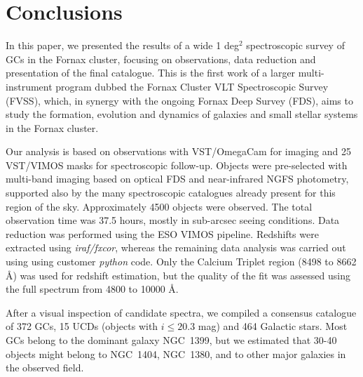 \documentclass[useAMS,usenatbib]{mn2e}
\begin{document}
\section{Conclusions}
\label{sec:conclusions}
In this paper, we presented the results of a wide 1 deg$^2$ spectroscopic survey of 
GCs in the Fornax cluster, focusing on observations, data 
reduction and presentation of the final catalogue. This is the first work of a 
larger multi-instrument program dubbed the Fornax Cluster VLT Spectroscopic 
Survey (FVSS), which, in synergy with the ongoing Fornax Deep Survey (FDS), 
aims to study the formation, evolution and dynamics of galaxies and small 
stellar systems in the Fornax cluster.

Our analysis is based on observations with VST/OmegaCam for imaging and 25 
VST/VIMOS masks for spectroscopic follow-up. Objects were pre-selected 
with multi-band imaging based on optical FDS and near-infrared NGFS photometry, 
supported also by the many spectroscopic catalogues already 
present for this region of the sky.  Approximately 4500 objects were observed. 
The total observation time was 37.5 hours, mostly in sub-arcsec seeing 
conditions. Data reduction was performed using the ESO VIMOS pipeline. 
Redshifts were extracted using {\it iraf/fxcor}, whereas the remaining data analysis 
was carried out using using customer {\it python} code. Only the Calcium Triplet region
(8498 to 8662 \AA) was used for redshift estimation, but the quality of the fit 
was assessed using the full spectrum from 4800 to 10000 \AA.

After a visual inspection of candidate spectra, we compiled a consensus 
catalogue of 372 GCs, 15 UCDs (objects with $i \le 20.3$ mag) and 464 Galactic 
stars. Most GCs belong to the dominant galaxy NGC~1399, but we estimated that 
30-40 objects might belong to NGC~1404, NGC~1380, and to other major galaxies 
in the observed field.
\end{document}
